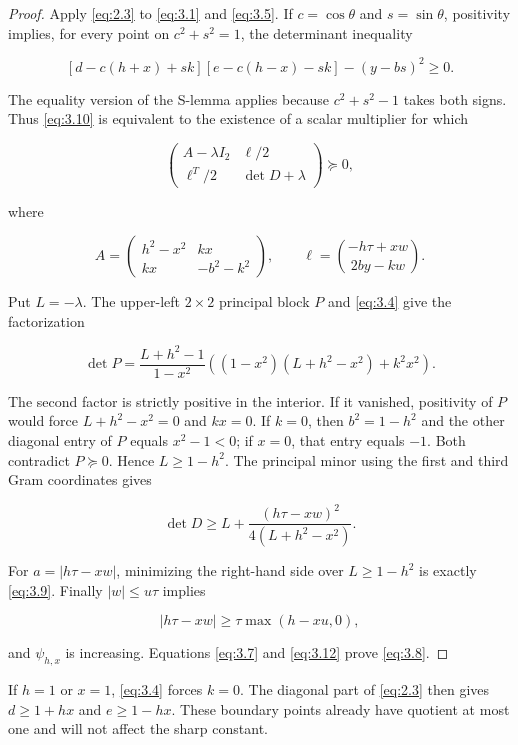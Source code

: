 \documentclass[11pt]{article}
\begin{document}
\begin{proof}
Apply \eqref{eq:2.3} to \eqref{eq:3.1} and \eqref{eq:3.5}. If $c=\cos\theta$ and
$s=\sin\theta$, positivity implies, for every point on $c^2+s^2=1$, the
determinant inequality

\[
[d-c(h+x)+sk][e-c(h-x)-sk]-(y-bs)^2\ge0.
\tag{3.10}\label{eq:3.10}
\]

The equality version of the S-lemma \cite{xia-wang-sheu} applies because
$c^2+s^2-1$ takes both signs. Thus \eqref{eq:3.10} is equivalent to the existence of a
scalar multiplier for which

\[
\begin{pmatrix}
A-\lambda I_2&\ell/2\\
\ell^T/2&\det D+\lambda
\end{pmatrix}\succeq0,
\]

where

\[
A=\begin{pmatrix}h^2-x^2&kx\\kx&-b^2-k^2\end{pmatrix},
\qquad
\ell=\binom{-h\tau+xw}{2by-kw}.
\]

Put $L=-\lambda$. The upper-left $2\times2$ principal block $P$ and
\eqref{eq:3.4} give the factorization

\[
\det P=
\frac{L+h^2-1}{1-x^2}
\left((1-x^2)(L+h^2-x^2)+k^2x^2\right).
\tag{3.11}\label{eq:3.11}
\]

The second factor is strictly positive in the interior. If it vanished, positivity
of $P$ would force $L+h^2-x^2=0$ and $kx=0$. If $k=0$, then
$b^2=1-h^2$ and the other diagonal entry of $P$ equals $x^2-1<0$; if
$x=0$, that entry equals $-1$. Both contradict $P\succeq0$. Hence
$L\ge1-h^2$.
The principal minor using the first and third Gram coordinates gives

\[
\det D\ge
L+\frac{(h\tau-xw)^2}{4(L+h^2-x^2)}.
\tag{3.12}\label{eq:3.12}
\]

For $a=|h\tau-xw|$, minimizing the right-hand side over $L\ge1-h^2$
is exactly \eqref{eq:3.9}. Finally $|w|\le u\tau$ implies

\[
|h\tau-xw|\ge\tau\max(h-xu,0),
\]

and $\psi_{h,x}$ is increasing. Equations \eqref{eq:3.7} and \eqref{eq:3.12} prove \eqref{eq:3.8}.
\end{proof}


If $h=1$ or $x=1$, \eqref{eq:3.4} forces $k=0$. The diagonal part of \eqref{eq:2.3} then gives
$d\ge1+hx$ and $e\ge1-hx$. These boundary points already have quotient at most
one and will not affect the sharp constant.
\end{document}
